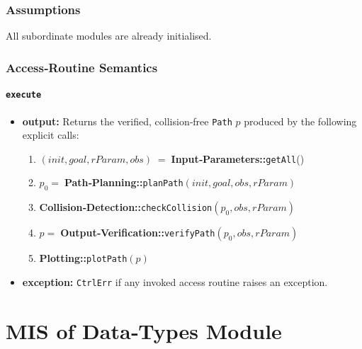 \documentclass[12pt, titlepage]{article}
\begin{document}
\subsubsection{Assumptions}
All subordinate modules are already initialised.

\subsubsection{Access‑Routine Semantics}

\paragraph{\texttt{execute}}
\begin{itemize}
  \item \textbf{output:} Returns the verified, collision‑free
        \texttt{Path} $p$ produced by the following explicit calls:
        \begin{enumerate}
          \item $(\textit{init},\textit{goal},rParam,obs)\;=\;$\textbf{Input‑Parameters::}\texttt{getAll}()
          \item $p_0=\;$\textbf{Path‑Planning::}\texttt{planPath}$(\textit{init},\textit{goal},obs,rParam)$
          \item \textbf{Collision‑Detection::}\texttt{checkCollision}$(p_0,obs,rParam)$
          \item $p=\;$\textbf{Output‑Verification::}\texttt{verifyPath}$(p_0,obs,rParam)$
          \item \textbf{Plotting::}\texttt{plotPath}$(p)$
        \end{enumerate}
  \item \textbf{exception:} \texttt{CtrlErr} if any invoked access routine
        raises an exception.
\end{itemize}


\newpage



\section{MIS of Data‑Types Module}
\label{mod:dtypes}

\end{document}
